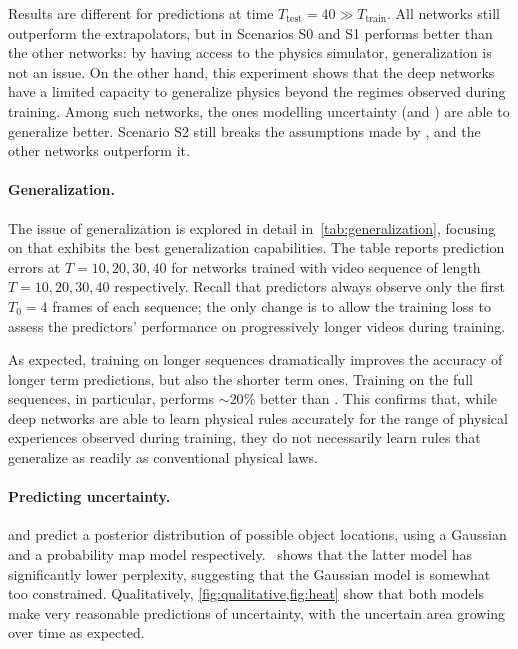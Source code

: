 
Results are different for predictions at time $T_\text{test}=40 \gg T_\text{train}$. All networks still outperform the extrapolators, but in Scenarios S0 and S1 \SimNet performs better than the other networks: by having access to the physics simulator, generalization is not an issue. On the other hand, this experiment shows that the deep networks have a limited capacity to generalize physics beyond the regimes observed during training. Among such networks, the ones modelling uncertainty (\NetThree and \NetFour) are able to generalize better. Scenario S2 still breaks the assumptions made by \SimNet, and the other networks outperform it.

\paragraph{Generalization.} The issue of generalization is explored in detail in~\cref{tab:generalization}, focusing on \NetFour that exhibits the best generalization capabilities. The table reports prediction errors at $T=10,20,30,40$ for networks trained with video sequence of length $T=10,20,30,40$ respectively. Recall that predictors always observe only the first $T_0=4$ frames of each sequence; the only change is to allow the training loss to assess the predictors' performance on progressively longer videos during training.

As expected, training on longer sequences dramatically improves the accuracy of longer term predictions, but also the shorter term ones. Training on the full sequences, in particular, performs $\sim20\%$ better than \SimNet. This confirms that, while deep networks are able to learn physical rules accurately for the range of physical experiences observed during training, they do not necessarily learn rules that generalize as readily as conventional physical laws.

\paragraph{Predicting uncertainty.} \NetThree and \NetFour predict a posterior distribution of possible object locations, using a Gaussian and a  probability map model respectively. ~shows that the latter model has significantly lower perplexity, suggesting that the Gaussian model is somewhat too constrained. Qualitatively, \cref{fig:qualitative,fig:heat} show that both models make very reasonable predictions of uncertainty, with the uncertain area growing over time as expected.

